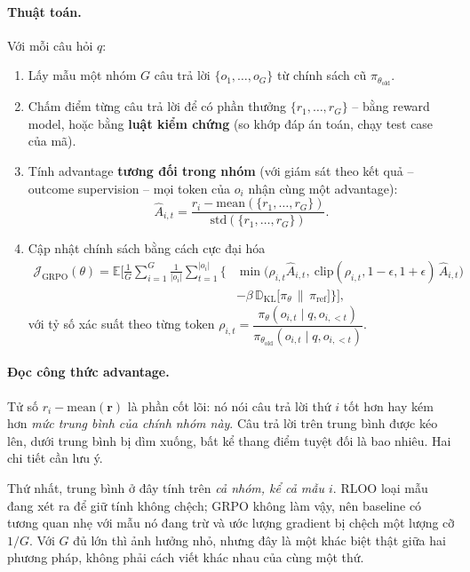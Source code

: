 \paragraph{Thuật toán.} Với mỗi câu hỏi $q$:
\begin{enumerate}
	\item Lấy mẫu một nhóm $G$ câu trả lời $\{o_1, \dots, o_G\}$ từ chính sách cũ $\pi_{\theta_{\text{old}}}$.
	\item Chấm điểm từng câu trả lời để có phần thưởng $\{r_1, \dots, r_G\}$ -- bằng reward model, hoặc bằng \textbf{luật kiểm chứng} (so khớp đáp án toán, chạy test case của mã).
	\item Tính advantage \textbf{tương đối trong nhóm} (với giám sát theo kết quả -- outcome supervision -- mọi token của $o_i$ nhận cùng một advantage):
	\[
	\hat{A}_{i,t} = \frac{r_i - \text{mean}(\{r_1,\dots,r_G\})}{\text{std}(\{r_1,\dots,r_G\})}.
	\]
	\item Cập nhật chính sách bằng cách cực đại hóa
	\[
	\begin{aligned}
	\mathcal{J}_{\text{GRPO}}(\theta) = \mathbb{E}\Big[\frac{1}{G}\sum_{i=1}^{G}\frac{1}{|o_i|}\sum_{t=1}^{|o_i|}\Big\{
	&\min\big(\rho_{i,t}\hat{A}_{i,t},\ \text{clip}(\rho_{i,t}, 1-\epsilon, 1+\epsilon)\,\hat{A}_{i,t}\big) \\
	&- \beta\, \mathbb{D}_{\text{KL}}\big[\pi_\theta \,\|\, \pi_{\text{ref}}\big]\Big\}\Big],
	\end{aligned}
	\]
	với tỷ số xác suất theo từng token $\rho_{i,t} = \dfrac{\pi_\theta(o_{i,t}\mid q, o_{i,<t})}{\pi_{\theta_{\text{old}}}(o_{i,t}\mid q, o_{i,<t})}$.
\end{enumerate}

\paragraph{Đọc công thức advantage.}
Tử số $r_i - \text{mean}(\mathbf{r})$ là phần cốt lõi: nó nói câu trả lời thứ $i$ tốt hơn hay kém hơn \emph{mức trung bình của chính nhóm này}. Câu trả lời trên trung bình được kéo lên, dưới trung bình bị dìm xuống, bất kể thang điểm tuyệt đối là bao nhiêu. Hai chi tiết cần lưu ý.

Thứ nhất, trung bình ở đây tính trên \emph{cả nhóm, kể cả mẫu $i$}. RLOO loại mẫu đang xét ra để giữ tính không chệch; GRPO không làm vậy, nên baseline có tương quan nhẹ với mẫu nó đang trừ và ước lượng gradient bị chệch một lượng cỡ $1/G$. Với $G$ đủ lớn thì ảnh hưởng nhỏ, nhưng đây là một khác biệt thật giữa hai phương pháp, không phải cách viết khác nhau của cùng một thứ.

